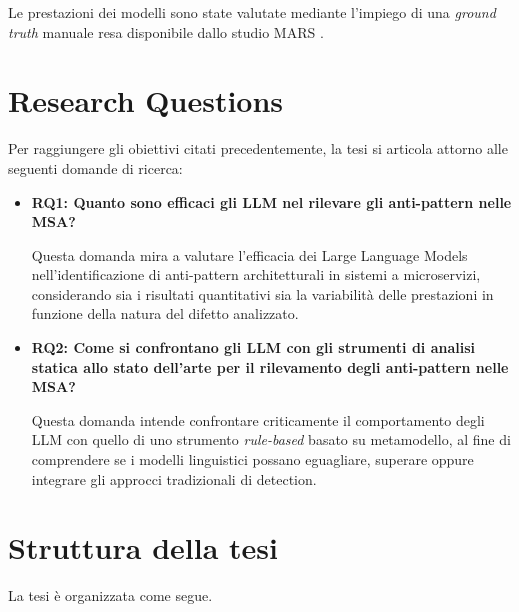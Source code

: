 Le prestazioni dei modelli sono state valutate mediante l'impiego di una \textit{ground truth} manuale resa disponibile dallo studio MARS \cite{MARS}.


\section{Research Questions}

Per raggiungere gli obiettivi citati precedentemente, la tesi si articola attorno alle seguenti domande di ricerca:

\begin{itemize}
    \item \textbf{RQ1: Quanto sono efficaci gli LLM nel rilevare gli anti-pattern nelle MSA?}
    
    Questa domanda mira a valutare l’efficacia dei Large Language Models nell’identificazione di anti-pattern architetturali in sistemi a microservizi, considerando sia i risultati quantitativi sia la variabilità delle prestazioni in funzione della natura del difetto analizzato.
    

    \item \textbf{RQ2: Come si confrontano gli LLM con gli strumenti di analisi statica allo stato dell’arte per il rilevamento degli anti-pattern nelle MSA?}
    
    Questa domanda intende confrontare criticamente il comportamento degli LLM con quello di uno strumento \textit{rule-based} basato su metamodello, al fine di comprendere se i modelli linguistici possano eguagliare, superare oppure integrare gli approcci tradizionali di detection.
\end{itemize}

\section{Struttura della tesi}

La tesi è organizzata come segue.

